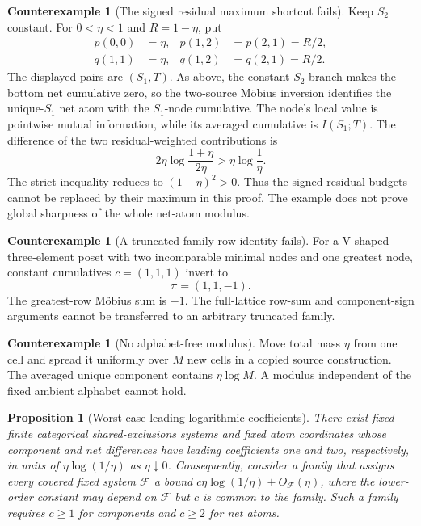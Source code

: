\documentclass[11pt]{article}
\newtheorem{proposition}[theorem]{Proposition}
\theoremstyle{definition}
\newtheorem{counterexample}[theorem]{Counterexample}
\begin{document}
\begin{counterexample}[The signed residual maximum shortcut fails]
Keep \(S_2\) constant.  For \(0<\eta<1\) and \(R=1-\eta\), put
\begin{align}
  p(0,0)&=\eta,&
  p(1,2)&=p(2,1)=R/2,\\
  q(1,1)&=\eta,&
  q(1,2)&=q(2,1)=R/2.
\end{align}
The displayed pairs are \((S_1,T)\).  As above, the constant-\(S_2\) branch makes the bottom net
cumulative zero, so the two-source M{\"o}bius inversion identifies the unique-\(S_1\) net atom
with the \(S_1\)-node cumulative.  The node's local value is pointwise mutual information, while
its averaged cumulative is \(I(S_1;T)\).  The difference of the two residual-weighted
contributions is
\begin{equation}
  2\eta\log\frac{1+\eta}{2\eta}
  >
  \eta\log\frac1\eta.
\end{equation}
The strict inequality reduces to \((1-\eta)^2>0\).  Thus the signed residual budgets cannot be
replaced by their maximum in this proof.  The example does not prove global sharpness of the whole
net-atom modulus.
\end{counterexample}

\begin{counterexample}[A truncated-family row identity fails]
For a V-shaped three-element poset with two incomparable minimal nodes and one greatest node,
constant cumulatives \(c=(1,1,1)\) invert to
\begin{equation}
  \pi=(1,1,-1).
\end{equation}
The greatest-row M{\"o}bius sum is \(-1\).  The full-lattice row-sum and component-sign arguments
cannot be transferred to an arbitrary truncated family.
\end{counterexample}

\begin{counterexample}[No alphabet-free modulus]
Move total mass \(\eta\) from one cell and spread it uniformly over \(M\) new cells in a copied
source construction.  The averaged unique component contains \(\eta\log M\).  A modulus
independent of the fixed ambient alphabet cannot hold.
\end{counterexample}

\begin{proposition}[Worst-case leading logarithmic coefficients]\label{prop:leading-sharp}
There exist fixed finite categorical shared-exclusions systems and fixed atom coordinates whose
component and net differences have leading coefficients one and two, respectively, in units of
\(\eta\log(1/\eta)\) as \(\eta\downarrow0\).  Consequently, consider a family that assigns every
covered fixed system \(\mathcal F\) a bound
\(c\eta\log(1/\eta)+O_{\mathcal F}(\eta)\), where the lower-order constant may depend on
\(\mathcal F\) but \(c\) is common to the family.  Such a family requires \(c\geq1\) for
components and \(c\geq2\) for net atoms.
\end{proposition}
\end{document}
